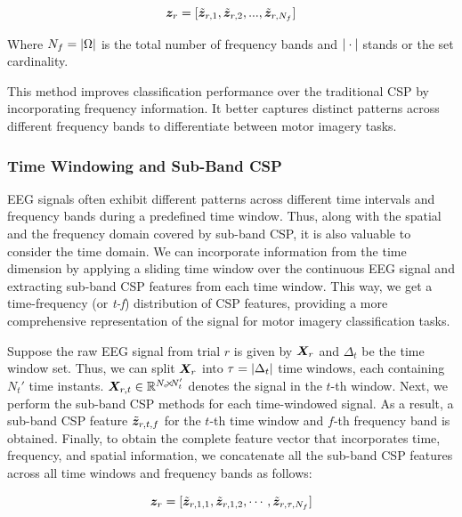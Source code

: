 \begin{equation}
\bm {z}_r = [\tilde{\bm {z}}_{r,1}, \tilde{\bm {z}}_{r,2}, ..., \tilde{\bm {z}}_{r,N_f}]   
\end{equation}

Where $N_f = | \Omega |$ is the total number of frequency bands and $| \cdot |$ stands or the set cardinality.

This method improves classification performance over the traditional CSP by incorporating frequency information. It better captures distinct patterns across different frequency bands to differentiate between motor imagery tasks.

\subsubsection{Time Windowing and Sub-Band CSP}

EEG signals often exhibit different patterns across different time intervals and frequency bands during a predefined time window. Thus, along with the spatial and the frequency domain covered by sub-band CSP, it is also valuable to consider the time domain. We can incorporate information from the time dimension by applying a sliding time window over the continuous EEG signal and extracting sub-band CSP features from each time window. This way, we get a time-frequency (or \textit{t-f}) distribution of CSP features, providing a more comprehensive representation of the signal for motor imagery classification tasks.

Suppose the raw EEG signal from trial $r$ is given by $\bm {X}_r$ and $\Delta_t$ be the time window set. Thus, we can split $\bm {X}_r$ into $\tau = | \Delta_t |$ time windows, each containing $N_{t}'$ time instants. $\bm {X}_{r,t} \in \mathbb{R}^{N_c \negthickspace\times\negthickspace N_{t}'}$ denotes the signal in the $t$-th window. Next, we perform the sub-band CSP methods for each time-windowed signal. As a result, a sub-band CSP feature $\tilde{\bm {z}}_{r,t,f}$ for the $t$-th time window and $f$-th frequency band is obtained. Finally, to obtain the complete feature vector that incorporates time, frequency, and spatial information, we concatenate all the sub-band CSP features across all time windows and frequency bands as follows:

\begin{equation}
\bm {z}_r = [\tilde{\bm {z}}_{r,1,1}, \tilde{\bm {z}}_{r,1,2}, \cdots, \tilde{\bm {z}}_{r,\tau,N_f}]    
\end{equation}


